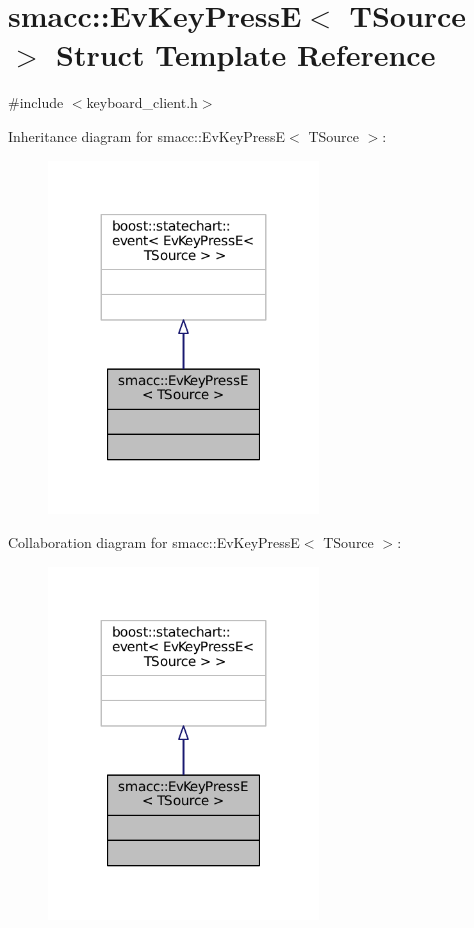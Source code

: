 \hypertarget{structsmacc_1_1EvKeyPressE}{}\section{smacc\+:\+:Ev\+Key\+PressE$<$ T\+Source $>$ Struct Template Reference}
\label{structsmacc_1_1EvKeyPressE}


{\ttfamily \#include $<$keyboard\+\_\+client.\+h$>$}



Inheritance diagram for smacc\+:\+:Ev\+Key\+PressE$<$ T\+Source $>$\+:
\nopagebreak
\begin{figure}[H]
\begin{center}
\leavevmode
\includegraphics[width=203pt]{structsmacc_1_1EvKeyPressE__inherit__graph}
\end{center}
\end{figure}


Collaboration diagram for smacc\+:\+:Ev\+Key\+PressE$<$ T\+Source $>$\+:
\nopagebreak
\begin{figure}[H]
\begin{center}
\leavevmode
\includegraphics[width=203pt]{structsmacc_1_1EvKeyPressE__coll__graph}
\end{center}
\end{figure}


